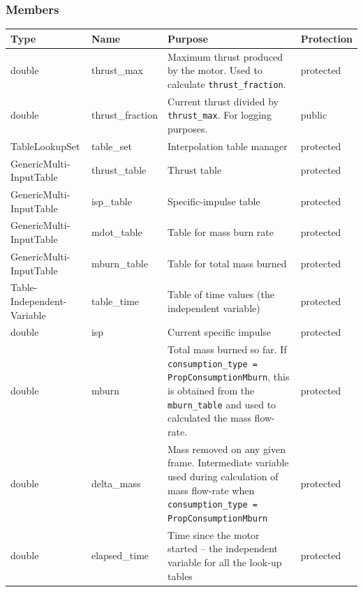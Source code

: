 \documentclass[11pt,fleqn]{report}
\begin{document}
\subsubsection{Members}
\begin{center}
\begin{longtable}{|p{2.75cm}|p{2.8cm}|p{7.1cm}|l|} \hline
\textbf{Type} & \textbf{Name} & \textbf{Purpose} & \textbf{Protection} \\
\hline
\endhead
double & thrust\_max & Maximum thrust produced by the motor. Used to calculate \verb|thrust_fraction|. & protected \\
\hline
double & thrust\_fraction & Current thrust divided by \verb|thrust_max|. For logging purposes. & public \\
\hline
TableLookupSet & table\_set & Interpolation table manager & protected \\
\hline
GenericMulti-\newline InputTable & thrust\_table & Thrust table & protected \\
\hline
GenericMulti-\newline InputTable & isp\_table & Specific-impulse table & protected \\
\hline
GenericMulti-\newline InputTable & mdot\_table & Table for mass burn rate & protected \\
\hline
GenericMulti-\newline InputTable & mburn\_table & Table for total mass burned & protected \\
\hline
Table-\newline Independent-\newline Variable & table\_time & Table of time values (the independent variable) & protected \\
\hline
double & isp & Current specific impulse & protected \\
\hline
double & mburn & Total mass burned so far. If \newline \verb|consumption_type =| \newline \verb|PropConsumptionMburn|, this is obtained from the \verb|mburn_table| and used to calculated the mass flow-rate. & protected \\
\hline
double & delta\_mass & Mass removed on any given frame. Intermediate variable used during calculation of mass flow-rate when \verb|consumption_type =|\newline \verb| PropConsumptionMburn| & protected \\
\hline
double & elapsed\_time & Time since the motor started -- the independent variable for all the look-up tables & protected \\

\end{longtable}
\end{center}
\end{document}
